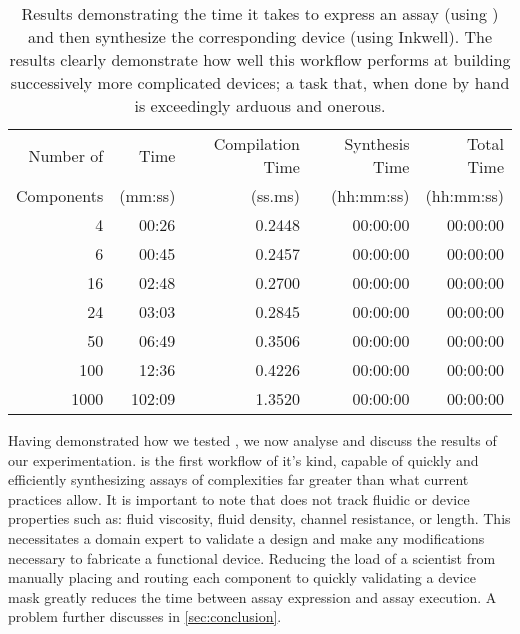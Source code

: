 \begin{table*}[htb]
\centering
\caption{Results demonstrating the time it takes to express an assay (using \bs{}) and then synthesize the corresponding device (using Inkwell).  The results clearly demonstrate how well this workflow performs at building successively more complicated devices; a task that, when done by hand is exceedingly arduous and onerous.}
\label{tab:synthesis_time}
\begin{tabular}{@{}rrrrr@{}}
\toprule
Number of & \bs{} Time & Compilation Time & Synthesis Time & Total Time \\
Components & (mm:ss) & (ss.ms) & (hh:mm:ss) & (hh:mm:ss) \\ \midrule
4 & 00:26 & 0.2448 & 00:00:00 & 00:00:00\\
6 & 00:45 & 0.2457 & 00:00:00 & 00:00:00\\
16 & 02:48 & 0.2700 & 00:00:00 & 00:00:00\\
24 & 03:03 & 0.2845 & 00:00:00 & 00:00:00\\
50 & 06:49 & 0.3506 & 00:00:00 & 00:00:00 \\ 
100 & 12:36 & 0.4226 & 00:00:00 & 00:00:00 \\
1000 & 102:09 & 1.3520 & 00:00:00 & 00:00:00 \\
\hline
\end{tabular}
\end{table*}

Having demonstrated how we tested \tool{}, we now analyse and discuss the results of our experimentation.
\tool{} is the first workflow of it's kind, capable of quickly and efficiently synthesizing assays of complexities far greater than what current practices allow.
It is important to note that \tool{} does not track fluidic or device properties such as: fluid viscosity, fluid density, channel resistance, or length.
This necessitates a domain expert to validate a design and make any modifications necessary to fabricate a functional device.
Reducing the load of a scientist from manually placing and routing each component to quickly validating a device mask greatly reduces the time between assay expression and assay execution.
A problem further discusses in \cref{sec:conclusion}.



